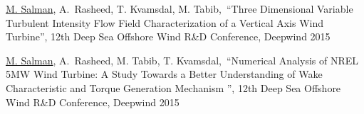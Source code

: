 

\begin{cventries}
	
	\cventry
	{} %
	{} %
	{} %
	{} %
	{
		\begin{cvitems} %
		\item {\underline{M. Salman}, A. Rasheed, T.  Kvamsdal, M. Tabib, “Three Dimensional Variable Turbulent Intensity Flow Field Characterization of a Vertical Axis Wind Turbine”, 12th Deep Sea Offshore Wind R&D Conference, Deepwind 2015}
		\item {\underline{M. Salman}, A. Rasheed, M. Tabib, T.  Kvamsdal, “Numerical Analysis of NREL 5MW Wind Turbine: A Study Towards a Better Understanding of Wake Characteristic and Torque Generation Mechanism ”, 12th Deep Sea Offshore Wind R&D Conference, Deepwind 2015}
		
		
		\end{cvitems}
	}
	
	
\end{cventries}
